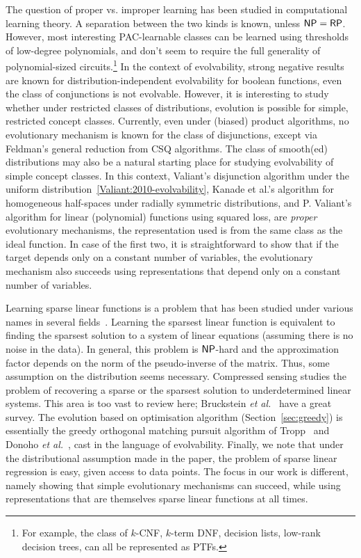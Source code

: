 The question of proper vs. improper learning has been studied in computational
learning theory. A separation between the two kinds is known, unless $\mathsf{NP} =
\mathsf{RP}$. However, most interesting PAC-learnable classes can be learned using
thresholds of low-degree polynomials, and don't seem to require the full
generality of polynomial-sized circuits.\footnote{For example, the class of
$k$-CNF, $k$-term DNF, decision lists, low-rank decision trees, can all be
represented as PTFs.} In the context of evolvability, strong negative results
are known for distribution-independent evolvability for boolean functions, \eg
even the class of conjunctions is not evolvable. However, it is interesting to
study whether under restricted classes of distributions, evolution is possible
for simple, restricted concept classes. Currently, even under (biased) product
algorithms, no evolutionary mechanism is known for the class of disjunctions,
except via Feldman's general reduction from CSQ algorithms. The class of
smooth(ed) distributions may also be a natural starting place for studying
evolvability of simple concept classes. In this context, Valiant's disjunction
algorithm under the uniform distribution~\ref{Valiant:2010-evolvability}, Kanade
et al.'s algorithm for homogeneous half-spaces under radially symmetric
distributions, and P. Valiant's algorithm for linear (polynomial) functions
using squared loss, are \emph{proper} evolutionary mechanisms, \ie the
representation used is from the same class as the ideal function. In case of the
first two, it is straightforward to show that if the target depends only on a
constant number of variables, the evolutionary mechanism also succeeds using
representations that depend only on a constant number of variables.


Learning sparse linear functions is a problem that has been studied under
various names in several fields~. Learning
the sparsest linear function is equivalent to finding the sparsest solution to a
system of linear equations (assuming there is no noise in the data). In general,
this problem is $\mathsf{NP}$-hard and the approximation factor depends on the norm of
the pseudo-inverse of the matrix\cite{Natarjan:1995}. Thus, some assumption on
the distribution seems necessary. Compressed sensing studies the problem of
recovering a sparse or the sparsest solution to underdetermined linear systems.
This area is too vast to review here; Bruckstein \emph{et
al.}~\cite{Donoho:2009-sparse} have a great survey. The evolution based on
optimisation algorithm (Section~\ref{sec:greedy}) is essentially the greedy
orthogonal matching pursuit algorithm of Tropp~\cite{Tropp:2004-greed} and
Donoho \emph{et al.}~\cite{Donoho:2006-recovery}, cast in the language of
evolvability. Finally, we note that under the distributional assumption made in
the paper, the problem of sparse linear regression is easy, given access to data
points. The focus in our work is different, namely showing that simple
evolutionary mechanisms can succeed, while using representations that are
themselves sparse linear functions at all times.


